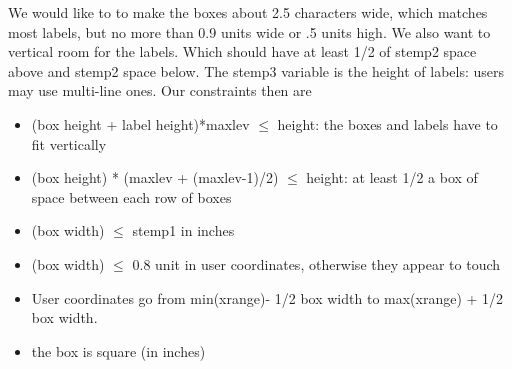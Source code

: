 \documentclass{article}
\begin{document}
We would like to to make the boxes about 2.5 characters wide, which matches
most labels, but no more than 0.9 units wide or .5 units high.  
We also want to vertical room for the labels. Which should have at least
1/2 of stemp2 space above and stemp2 space below.  
The stemp3 variable is the height of labels: users may use multi-line ones.
Our constraints then are
\begin{itemize}
  \item (box height + label height)*maxlev $\le$ height: the boxes and labels have
    to fit vertically
  \item (box height) * (maxlev + (maxlev-1)/2) $\le$ height: at least 1/2 a box of
    space between each row of boxes
  \item (box width) $\le$ stemp1 in inches 
  \item (box width) $\le$ 0.8 unit in user coordinates, otherwise they appear 
    to touch
  \item User coordinates go from min(xrange)- 1/2 box width to 
    max(xrange) + 1/2 box width.
  \item the box is square (in inches)
\end{itemize}
\end{document}
